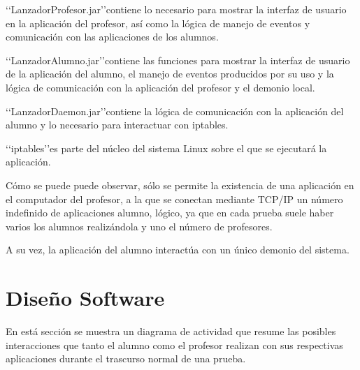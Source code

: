 \lq\lq LanzadorProfesor.jar\rq\rq contiene lo necesario para mostrar la interfaz de usuario en la aplicación del profesor, así como la lógica de manejo de eventos y comunicación con las aplicaciones de los alumnos.

\lq\lq LanzadorAlumno.jar\rq\rq contiene las funciones para mostrar la interfaz de usuario de la aplicación del alumno, el manejo de eventos producidos por su uso y la lógica de comunicación con la aplicación del profesor y el demonio local.

\lq\lq LanzadorDaemon.jar\rq\rq contiene la lógica de comunicación con la aplicación del alumno y lo necesario para interactuar con iptables.

\lq\lq iptables\rq\rq es parte del núcleo del sistema Linux sobre el que se ejecutará la aplicación.

Cómo se puede puede observar, sólo se permite la existencia de una aplicación en el computador del profesor, a la que se conectan mediante TCP/IP un número indefinido de aplicaciones alumno, lógico, ya que en cada prueba suele haber varios los alumnos realizándola y uno el número de profesores.
\newline

A su vez, la aplicación del alumno interactúa con un único demonio del sistema.


\section{Diseño Software}
\label{sec:arquitectura:diseno}

En está sección se muestra un diagrama de actividad que resume las posibles interacciones que tanto el alumno como el profesor realizan con sus respectivas aplicaciones durante el trascurso normal de una prueba.
\newline

